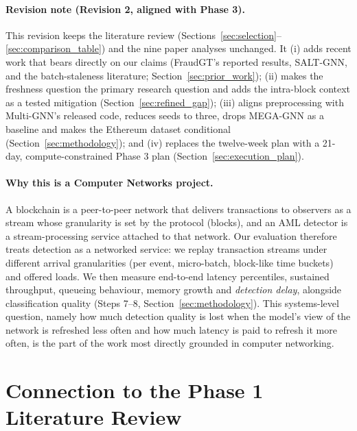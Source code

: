 \documentclass[11pt,a4paper]{article}
\begin{document}
\paragraph{Revision note (Revision 2, aligned with Phase 3).} This revision keeps the literature review (Sections~\ref{sec:selection}--\ref{sec:comparison_table}) and the nine paper analyses unchanged. It (i) adds recent work that bears directly on our claims (FraudGT's reported results, SALT-GNN, and the batch-staleness literature; Section~\ref{sec:prior_work}); (ii) makes the freshness question the primary research question and adds the intra-block context as a tested mitigation (Section~\ref{sec:refined_gap}); (iii) aligns preprocessing with Multi-GNN's released code, reduces seeds to three, drops MEGA-GNN as a baseline and makes the Ethereum dataset conditional (Section~\ref{sec:methodology}); and (iv) replaces the twelve-week plan with a 21-day, compute-constrained Phase 3 plan (Section~\ref{sec:execution_plan}).

\paragraph{Why this is a Computer Networks project.} A blockchain is a peer-to-peer network that delivers transactions to observers as a stream whose granularity is set by the protocol (blocks), and an AML detector is a stream-processing service attached to that network. Our evaluation therefore treats detection as a networked service: we replay transaction streams under different arrival granularities (per event, micro-batch, block-like time buckets) and offered loads. We then measure end-to-end latency percentiles, sustained throughput, queueing behaviour, memory growth and \emph{detection delay}, alongside classification quality (Steps 7--8, Section~\ref{sec:methodology}). This systems-level question, namely how much detection quality is lost when the model's view of the network is refreshed less often and how much latency is paid to refresh it more often, is the part of the work most directly grounded in computer networking.

\section{Connection to the Phase 1 Literature Review}
\label{sec:phase1_connection}
\end{document}
